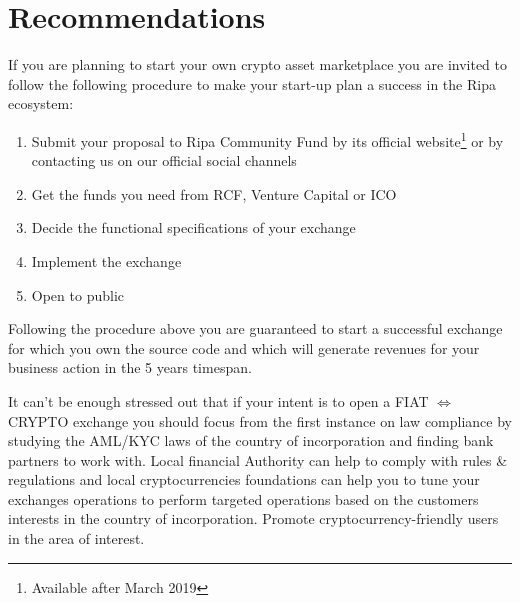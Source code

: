 \documentclass[11pt,fleqn,oneside]{book} %
\begin{document}
\begin{tcbraster}[raster columns=2,raster rows=4,raster height=10cm,
	valign=center, halign=left,
	enhanced,size=small,sharp corners,colframe=silver,coltext=black,
	colback=silver,fit algorithm=hybrid* ]
\end{tcbraster}

\section{Recommendations}
If you are planning to start your own crypto asset marketplace you are invited to follow the following procedure to make
your start-up plan a success in the Ripa ecosystem:
\begin{enumerate}
	\item Submit your proposal to Ripa Community Fund by its official website\footnote{Available after March 2019} or by contacting us
	on our official social channels
	\item Get the funds you need from RCF, Venture Capital or ICO
	\item Decide the functional specifications of your exchange
	\item Implement the exchange
	\item Open to public
\end{enumerate}

Following the procedure above you are guaranteed to start a successful exchange for which you own the source code and which will 
generate revenues for your business action in the 5 years timespan.

It can't be enough stressed out that if your intent is to open a FIAT $\Leftrightarrow$ CRYPTO exchange you should
focus from the first instance on law compliance by studying the AML/KYC laws of the country of incorporation and
finding bank partners to work with. Local financial Authority can help to comply with rules \& regulations and 
local cryptocurrencies foundations can help you to tune your exchanges operations to perform targeted
operations based on the customers interests in the country of incorporation. 
Promote cryptocurrency-friendly users in the area of interest.\\
\end{document}
